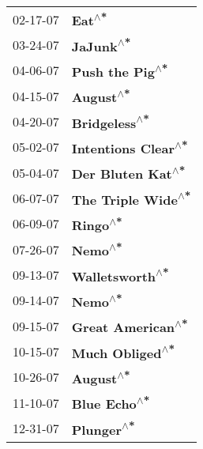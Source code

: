 \begin{supertabular}{p{0.25\columnwidth}p{0.75\columnwidth}}
 02-17-07 &               \textbf{Eat\textsuperscript{$\wedge$*}} \\
 03-24-07 &            \textbf{JaJunk\textsuperscript{$\wedge$*}} \\
 04-06-07 &      \textbf{Push the Pig\textsuperscript{$\wedge$*}} \\
 04-15-07 &            \textbf{August\textsuperscript{$\wedge$*}} \\
 04-20-07 &        \textbf{Bridgeless\textsuperscript{$\wedge$*}} \\
 05-02-07 &  \textbf{Intentions Clear\textsuperscript{$\wedge$*}} \\
 05-04-07 &    \textbf{Der Bluten Kat\textsuperscript{$\wedge$*}} \\
 06-07-07 &   \textbf{The Triple Wide\textsuperscript{$\wedge$*}} \\
 06-09-07 &             \textbf{Ringo\textsuperscript{$\wedge$*}} \\
 07-26-07 &              \textbf{Nemo\textsuperscript{$\wedge$*}} \\
 09-13-07 &      \textbf{Walletsworth\textsuperscript{$\wedge$*}} \\
 09-14-07 &              \textbf{Nemo\textsuperscript{$\wedge$*}} \\
 09-15-07 &    \textbf{Great American\textsuperscript{$\wedge$*}} \\
 10-15-07 &      \textbf{Much Obliged\textsuperscript{$\wedge$*}} \\
 10-26-07 &            \textbf{August\textsuperscript{$\wedge$*}} \\
 11-10-07 &         \textbf{Blue Echo\textsuperscript{$\wedge$*}} \\
 12-31-07 &           \textbf{Plunger\textsuperscript{$\wedge$*}} \\
\end{supertabular}
